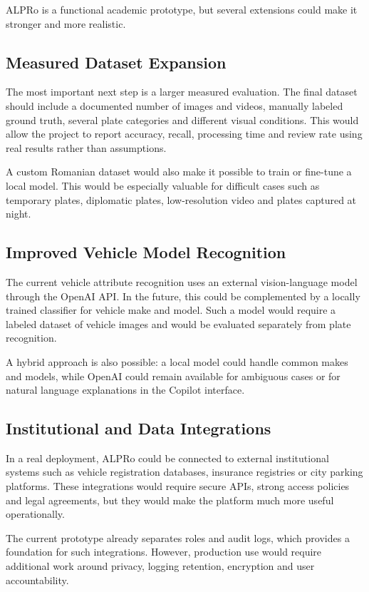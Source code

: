 ﻿\documentclass[12pt,a4paper]{article}
\begin{document}
ALPRo is a functional academic prototype, but several extensions could make it stronger and more realistic.

\subsection{Measured Dataset Expansion}

The most important next step is a larger measured evaluation. The final dataset should include a documented number of images and videos, manually labeled ground truth, several plate categories and different visual conditions. This would allow the project to report accuracy, recall, processing time and review rate using real results rather than assumptions.

A custom Romanian dataset would also make it possible to train or fine-tune a local model. This would be especially valuable for difficult cases such as temporary plates, diplomatic plates, low-resolution video and plates captured at night.

\subsection{Improved Vehicle Model Recognition}

The current vehicle attribute recognition uses an external vision-language model through the OpenAI API. In the future, this could be complemented by a locally trained classifier for vehicle make and model. Such a model would require a labeled dataset of vehicle images and would be evaluated separately from plate recognition.

A hybrid approach is also possible: a local model could handle common makes and models, while OpenAI could remain available for ambiguous cases or for natural language explanations in the Copilot interface.

\subsection{Institutional and Data Integrations}

In a real deployment, ALPRo could be connected to external institutional systems such as vehicle registration databases, insurance registries or city parking platforms. These integrations would require secure APIs, strong access policies and legal agreements, but they would make the platform much more useful operationally.

The current prototype already separates roles and audit logs, which provides a foundation for such integrations. However, production use would require additional work around privacy, logging retention, encryption and user accountability.
\end{document}

